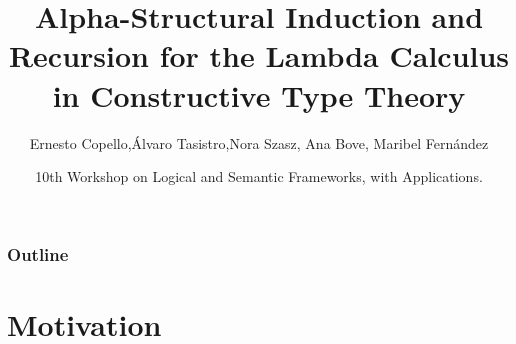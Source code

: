 \documentclass[utf,utf8x,hyperref=hidelinks,xcolor=table]{beamer}
\begin{document}
\title{Alpha-Structural Induction and Recursion for the Lambda Calculus in Constructive Type Theory}
\author{Ernesto Copello,\'Alvaro Tasistro,Nora Szasz, Ana Bove, Maribel Fern\'andez}

\date[LSFA ’15]{10th Workshop on Logical and Semantic Frameworks, with Applications.}

\begin{frame}
\titlepage
\end{frame}

\begin{frame}
\frametitle{Outline}
\tableofcontents
\end{frame}

\section{Motivation}
\end{document}
